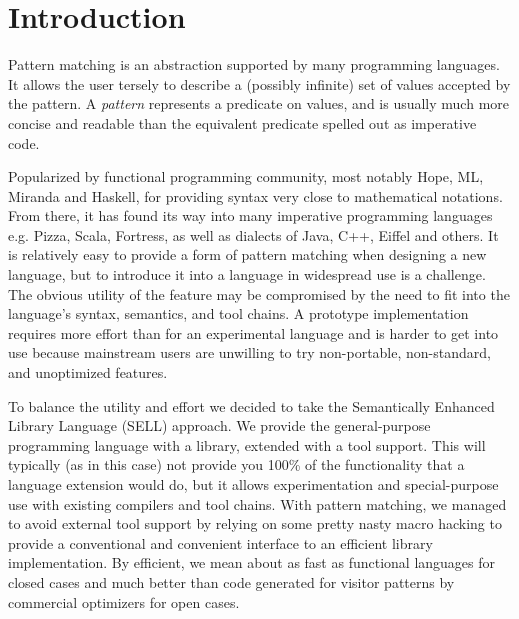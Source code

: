 \section{Introduction} %
\label{sec:intro}


Pattern matching is an abstraction supported by many programming languages.
It allows the user tersely to describe a (possibly infinite) set of 
values accepted by the pattern. A \emph{pattern} represents a predicate on 
values, and is usually  much more concise and readable than the 
equivalent predicate spelled out as imperative code.

Popularized by functional programming community, most notably Hope\cite{BMS80}, 
ML\cite{ML90}, Miranda\cite{Miranda85} and Haskell\cite{Haskell98Book}, for 
providing syntax very close to mathematical notations.
From there, it has 
found its way into many imperative programming languages e.g. 
Pizza\cite{Odersky97pizzainto}, Scala\cite{Scala2nd}, Fortress\cite{RPS10}, as 
well as dialects of Java\cite{Liu03jmatch:iterable,HydroJ2003}, C++\cite{Prop96}, 
Eiffel\cite{Moreau:2003} and others. It is relatively easy to provide a form of pattern 
matching when designing a new language, but to introduce it into a language in 
widespread use is a challenge. The obvious utility of the feature may be 
compromised by the need to fit into the language's syntax, semantics, and tool 
chains. A prototype implementation requires more effort than for an experimental 
language and is harder to get into use because mainstream users are unwilling 
to try non-portable, non-standard, and unoptimized features.

To balance the utility and effort we decided to take the Semantically 
Enhanced Library Language (SELL) approach\cite{SELL}. We provide the
general-purpose programming language with a library, extended with a tool 
support. This will typically (as in this case) not provide you 100\% of the functionality that a 
language extension would do, but it allows experimentation and special-purpose use
with existing compilers and tool chains. With pattern matching, we managed to avoid 
external tool support by relying on some pretty nasty macro hacking to provide a
conventional and convenient interface to an efficient library implementation.
By efficient, we mean about as fast as functional languages for closed cases and
much better than code generated for visitor patterns by commercial optimizers 
for open cases\cite{TypeSwitch}.


